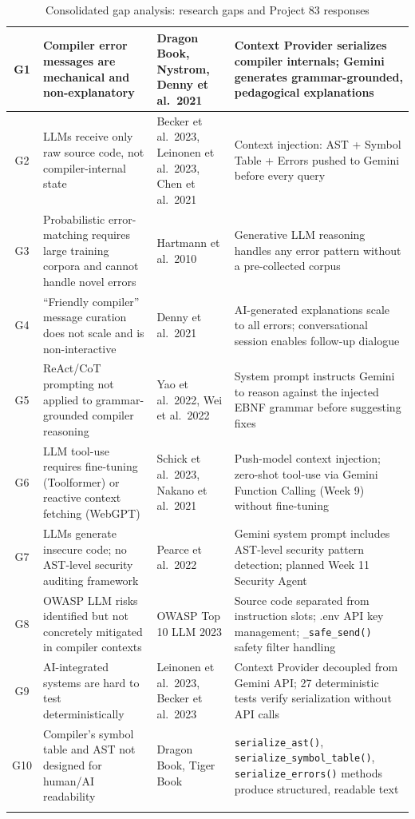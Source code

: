 \documentclass[a4paper,11pt]{article}
\begin{document}
\begin{longtable}{|c|p{3.5cm}|p{4cm}|p{4.5cm}|}
G1 & Compiler error messages are mechanical and non-explanatory & Dragon Book, Nystrom, Denny et al.\ 2021 & Context Provider serializes compiler internals; Gemini generates grammar-grounded, pedagogical explanations \\
\hline
G2 & LLMs receive only raw source code, not compiler-internal state & Becker et al.\ 2023, Leinonen et al.\ 2023, Chen et al.\ 2021 & Context injection: AST + Symbol Table + Errors pushed to Gemini before every query \\
\hline
G3 & Probabilistic error-matching requires large training corpora and cannot handle novel errors & Hartmann et al.\ 2010 & Generative LLM reasoning handles any error pattern without a pre-collected corpus \\
\hline
G4 & ``Friendly compiler'' message curation does not scale and is non-interactive & Denny et al.\ 2021 & AI-generated explanations scale to all errors; conversational session enables follow-up dialogue \\
\hline
G5 & ReAct/CoT prompting not applied to grammar-grounded compiler reasoning & Yao et al.\ 2022, Wei et al.\ 2022 & System prompt instructs Gemini to reason against the injected EBNF grammar before suggesting fixes \\
\hline
G6 & LLM tool-use requires fine-tuning (Toolformer) or reactive context fetching (WebGPT) & Schick et al.\ 2023, Nakano et al.\ 2021 & Push-model context injection; zero-shot tool-use via Gemini Function Calling (Week 9) without fine-tuning \\
\hline
G7 & LLMs generate insecure code; no AST-level security auditing framework & Pearce et al.\ 2022 & Gemini system prompt includes AST-level security pattern detection; planned Week 11 Security Agent \\
\hline
G8 & OWASP LLM risks identified but not concretely mitigated in compiler contexts & OWASP Top 10 LLM 2023 & Source code separated from instruction slots; .env API key management; \texttt{\_safe\_send()} safety filter handling \\
\hline
G9 & AI-integrated systems are hard to test deterministically & Leinonen et al.\ 2023, Becker et al.\ 2023 & Context Provider decoupled from Gemini API; 27 deterministic tests verify serialization without API calls \\
\hline
G10 & Compiler's symbol table and AST not designed for human/AI readability & Dragon Book, Tiger Book & \texttt{serialize\_ast()}, \texttt{serialize\_symbol\_table()}, \texttt{serialize\_errors()} methods produce structured, readable text \\
\hline

\caption{Consolidated gap analysis: research gaps and Project 83 responses}
\end{longtable}
\end{document}
